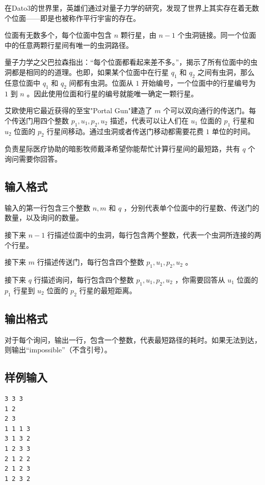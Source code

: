 \documentclass[12pt]{article}
\begin{document}
在Dato3的世界里，英雄们通过对量子力学的研究，发现了世界上其实存在着无数个位面——即是也被称作平行宇宙的存在。

位面有无数多个，每个位面中包含 $n$ 颗行星，由 $n−1$ 个虫洞链接。同一个位面中的任意两颗行星间有唯一的虫洞路径。

量子力学之父巴拉森指出：“每个位面都看起来差不多。”，揭示了所有位面中的虫洞都是相同的的道理。也即，如果某个位面中在行星 $q_1$ 和 $q_2$ 之间有虫洞，那么任意位面中 $q_1$ 和 $q_2$ 间都有虫洞。位面从 $1$ 开始编号，一个位面中的行星编号为 $1$ 到 $n$ 。因此使用位面和行星的编号就能唯一确定一颗行星。

艾欧使用它最近获得的至宝"Portal Gun"建造了 $m$ 个可以双向通行的传送门。每个传送门用四个整数 $p_1,u_1,p_2,u_2$ 描述，代表可以让人们在 $u_1$ 位面的 $p_1$ 行星和 $u_2$ 位面的 $p_2$ 行星间移动。通过虫洞或者传送门移动都需要花费 $1$ 单位的时间。

负责星际医疗协助的暗影牧师戴泽希望你能帮忙计算行星间的最短路，共有 $q$ 个询问需要你回答。

\subsection{输入格式}

输入的第一行包含三个整数 $n,m$ 和 $q$ ，分别代表单个位面中的行星数、传送门的数量，以及询问的数量。

接下来 $n−1$ 行描述位面中的虫洞，每行包含两个整数，代表一个虫洞所连接的两个行星。

接下来 $m$ 行描述传送门，每行包含四个整数 $p_1,u_1,p_2,u_2$ 。

接下来 $q$ 行描述询问，每行包含四个整数 $p_1,u_1,p_2,u_2$ ，你需要回答从 $u_1$ 位面的 $p_1$ 行星到 $u_2$ 位面的 $p_2$ 行星的最短距离。

\subsection{输出格式}

对于每个询问，输出一行，包含一个整数，代表最短路径的耗时。如果无法到达，则输出“impossible”（不含引号）。

\subsection{样例输入}

\begin{verbatim}
3 3 3
1 2
2 3
1 1 1 3
3 1 3 2
1 2 3 3
2 1 2 2
2 1 2 3
1 2 3 2
\end{verbatim}
\end{document}
